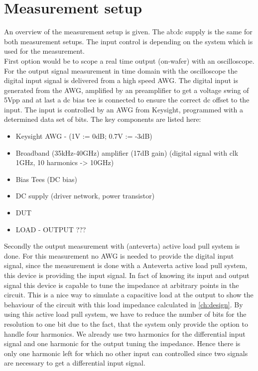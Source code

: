 \section{Measurement setup}
An overview of the measurement setup is given. 
The \gls{ab:dc} supply is the same for both measurement setups.
The input control is depending on the system which is used for the measurement.\\
First option would be to scope a real time output (on-wafer) with an oscilloscope.
For the output signal measurement in time domain with the oscilloscope the digital input signal is delivered from a high speed AWG.
The digital input is generated from the AWG, amplified by an preamplifier to get a voltage swing of 5Vpp and at last a dc bias tee is connected to ensure the correct dc offset to the input.
 The input is controlled by an AWG from Keysight, programmed with a determined data set of bits. The key components are listed here:
\begin{itemize}
	\item Keysight AWG - (1V := 0dB; 0.7V := -3dB)
	\item Broadband (35kHz-40GHz) amplifier (17dB gain) (digital signal with clk 1GHz, 10 harmonics -> 10GHz)
	\item Bias Tees (DC bias)
	\item DC supply (driver network, power transistor)
	\item DUT
	\item LOAD - OUTPUT ???
\end{itemize}

Secondly the output measurement with (anteverta) active load pull system is done.
For this measurement no AWG is needed to provide the digital input signal, since the measurement is done with a Anteverta active load pull system, this device is providing the input signal.
In fact of knowing its input and output signal this device is capable to tune the impedance at arbitrary points in the circuit.
This is a nice way to simulate a capacitive load at the output to show the behaviour of the circuit with this load impedance calculated in \ref{ch:design}.
By using this active load pull system, we have to reduce the number of bits for the resolution to one bit due to the fact, that the system only provide the option to handle four harmonics. 
We already use two harmonics for the differential input signal and one harmonic for the output tuning the impedance. 
Hence there is only one harmonic left for which no other input can controlled since two signals are necessary to get a differential input signal.


